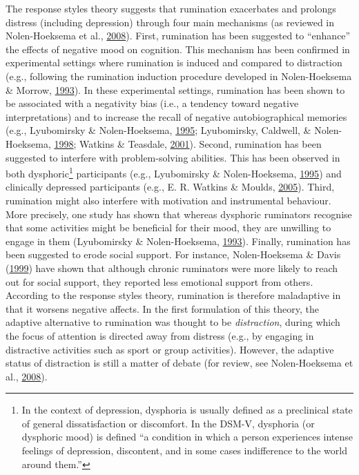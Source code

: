 \documentclass[a4paper,12pt,twoside,onecolumn,openright,final,oldfontcommands]{memoir}
\let\rmarkdownfootnote\footnote%
\def\footnote{\protect\rmarkdownfootnote}
\begin{document}
The response styles theory suggests that rumination exacerbates and prolongs distress (including depression) through four main mechanisms (as reviewed in Nolen-Hoeksema et al., \protect\hyperlink{ref-Nolen-Hoeksema2008}{2008}). First, rumination has been suggested to \enquote{enhance} the effects of negative mood on cognition. This mechanism has been confirmed in experimental settings where rumination is induced and compared to distraction (e.g., following the rumination induction procedure developed in Nolen-Hoeksema \& Morrow, \protect\hyperlink{ref-nolen-hoeksema_effects_1993}{1993}). In these experimental settings, rumination has been shown to be associated with a negativity bias (i.e., a tendency toward negative interpretations) and to increase the recall of negative autobiographical memories (e.g., Lyubomirsky \& Nolen-Hoeksema, \protect\hyperlink{ref-lyubomirsky_effects_1995}{1995}; Lyubomirsky, Caldwell, \& Nolen-Hoeksema, \protect\hyperlink{ref-Lyubomirsky1998}{1998}; Watkins \& Teasdale, \protect\hyperlink{ref-watkins_rumination_2001}{2001}). Second, rumination has been suggested to interfere with problem-solving abilities. This has been observed in both dysphoric\footnote{In the context of depression, dysphoria is usually defined as a preclinical state of general dissatisfaction or discomfort. In the DSM-V, dysphoria (or dysphoric mood) is defined \enquote{a condition in which a person experiences intense feelings of depression, discontent, and in some cases indifference to the world around them.}} participants (e.g., Lyubomirsky \& Nolen-Hoeksema, \protect\hyperlink{ref-lyubomirsky_effects_1995}{1995}) and clinically depressed participants (e.g., E. R. Watkins \& Moulds, \protect\hyperlink{ref-watkins_distinct_2005}{2005}). Third, rumination might also interfere with motivation and instrumental behaviour. More precisely, one study has shown that whereas dysphoric ruminators recognise that some activities might be beneficial for their mood, they are unwilling to engage in them (Lyubomirsky \& Nolen-Hoeksema, \protect\hyperlink{ref-lyubomirsky_self-perpetuating_1993}{1993}). Finally, rumination has been suggested to erode social support. For instance, Nolen-Hoeksema \& Davis (\protect\hyperlink{ref-nolen-hoeksema_thanks_1999}{1999}) have shown that although chronic ruminators were more likely to reach out for social support, they reported less emotional support from others. According to the response styles theory, rumination is therefore maladaptive in that it worsens negative affects. In the first formulation of this theory, the adaptive alternative to rumination was thought to be \emph{distraction}, during which the focus of attention is directed away from distress (e.g., by engaging in distractive activities such as sport or group activities). However, the adaptive status of distraction is still a matter of debate (for review, see Nolen-Hoeksema et al., \protect\hyperlink{ref-Nolen-Hoeksema2008}{2008}).
\end{document}
